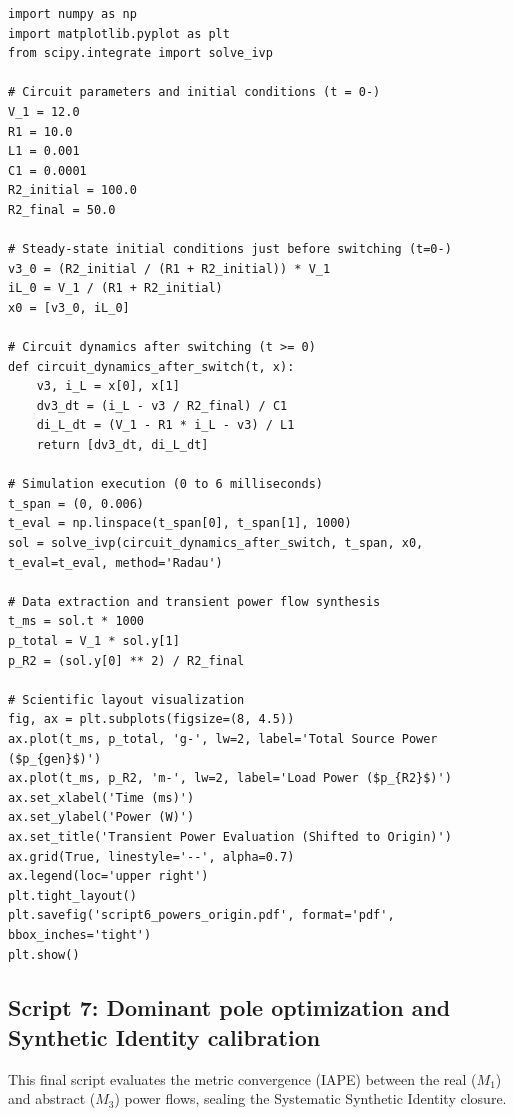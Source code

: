 \documentclass[11pt, a4paper]{article}
\begin{document}
{\footnotesize
\begin{verbatim}
import numpy as np
import matplotlib.pyplot as plt
from scipy.integrate import solve_ivp

# Circuit parameters and initial conditions (t = 0-)
V_1 = 12.0
R1 = 10.0
L1 = 0.001
C1 = 0.0001
R2_initial = 100.0
R2_final = 50.0

# Steady-state initial conditions just before switching (t=0-)
v3_0 = (R2_initial / (R1 + R2_initial)) * V_1
iL_0 = V_1 / (R1 + R2_initial)
x0 = [v3_0, iL_0]

# Circuit dynamics after switching (t >= 0)
def circuit_dynamics_after_switch(t, x):
    v3, i_L = x[0], x[1]
    dv3_dt = (i_L - v3 / R2_final) / C1
    di_L_dt = (V_1 - R1 * i_L - v3) / L1
    return [dv3_dt, di_L_dt]

# Simulation execution (0 to 6 milliseconds)
t_span = (0, 0.006)
t_eval = np.linspace(t_span[0], t_span[1], 1000)
sol = solve_ivp(circuit_dynamics_after_switch, t_span, x0, t_eval=t_eval, method='Radau')

# Data extraction and transient power flow synthesis
t_ms = sol.t * 1000
p_total = V_1 * sol.y[1]
p_R2 = (sol.y[0] ** 2) / R2_final

# Scientific layout visualization
fig, ax = plt.subplots(figsize=(8, 4.5))
ax.plot(t_ms, p_total, 'g-', lw=2, label='Total Source Power ($p_{gen}$)')
ax.plot(t_ms, p_R2, 'm-', lw=2, label='Load Power ($p_{R2}$)')
ax.set_xlabel('Time (ms)')
ax.set_ylabel('Power (W)')
ax.set_title('Transient Power Evaluation (Shifted to Origin)')
ax.grid(True, linestyle='--', alpha=0.7)
ax.legend(loc='upper right')
plt.tight_layout()
plt.savefig('script6_powers_origin.pdf', format='pdf', bbox_inches='tight')
plt.show()
\end{verbatim}
}


\subsection*{Script 7: Dominant pole optimization and Synthetic Identity calibration}
This final script evaluates the metric convergence (IAPE) between the real ($M_1$) and abstract ($M_3$) power flows, sealing the Systematic Synthetic Identity closure.
\end{document}

